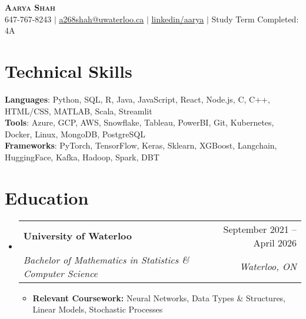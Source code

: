 \documentclass[letterpaper,11pt]{article}
\makeatletter
\newcommand{\resumeItem}[1]{
  \item\small{
    {#1 \vspace{-2pt}}
  }
}
\newcommand{\resumeSubheading}[4]{
  \vspace{-2pt}\item
    \begin{tabular*}{0.97\textwidth}[t]{l@{\extracolsep{\fill}}r}
      \textbf{#1} & #2 \\
      \textit{\small#3} & \textit{\small #4} \\
    \end{tabular*}\vspace{-7pt}
}
\newcommand{\resumeSubSubheading}[2]{
    \item
    \begin{tabular*}{0.97\textwidth}{l@{\extracolsep{\fill}}r}
      \textit{\small#1} & \textit{\small #2} \\
    \end{tabular*}\vspace{-7pt}
}
\newcommand{\resumeSubHeadingListStart}{\begin{itemize}[leftmargin=0.15in, label={}]}
\newcommand{\resumeSubHeadingListEnd}{\end{itemize}}
\newcommand{\resumeItemListStart}{\begin{itemize}}
\newcommand{\resumeItemListEnd}{\end{itemize}\vspace{-5pt}}
\makeatother
\begin{document}
\begin{center}
    \textbf{\Huge \scshape Aarya Shah} \\ \vspace{1pt}
    \small{} 647-767-8243 $|$ 
    \small{}\href{mailto:a268shah@uwaterloo.ca}{\underline{a268shah@uwaterloo.ca}} $|$ 
    \small{}\href{https://www.linkedin.com/in/AaryaShah127}{\underline{linkedin/aarya}} $|$ 
    \small{} Study Term Completed: 4A
\end{center}
%
\section{Technical Skills}
 \begin{itemize}[leftmargin=0.15in, label={}]
    \small{\item{
     \textbf{Languages}{: Python, SQL, R, Java, JavaScript, React, Node.js, C, C++, HTML/CSS, MATLAB, Scala, Streamlit} \\
     \textbf{Tools}{: Azure, GCP, AWS, Snowflake, Tableau, PowerBI, Git, Kubernetes, Docker, Linux, MongoDB, PostgreSQL} \\
     \textbf{Frameworks}{: PyTorch, TensorFlow, Keras, Sklearn, XGBoost, Langchain, HuggingFace, Kafka, Hadoop, Spark, DBT}
    }}
 \end{itemize}


      
\section{Education}

      
\resumeSubHeadingListStart
    \resumeSubheading
      {University of Waterloo}{September 2021 -- April 2026}
      {Bachelor of Mathematics in Statistics \& Computer Science}{Waterloo, ON}
      \resumeItemListStart
        \resumeItem{\textbf{Relevant Coursework:} Neural Networks, Data Types \& Structures, Linear Models, Stochastic Processes}
      \resumeItemListEnd
\resumeSubHeadingListEnd
\end{document}
